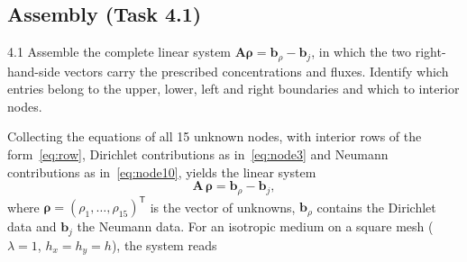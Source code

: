\documentclass[11pt,a4paper]{article}
\numberwithin{equation}{section}
\theoremstyle{definition}
\theoremstyle{remark}
\newcommand{\bA}{\mathbf{A}}
\newcommand{\brho}{\bm{\rho}}
\newcommand{\bb}{\bm{b}}
\begin{document}
\subsection{Assembly (Task 4.1)}\label{sec:assembly}

\begin{task}{4.1}
  Assemble the complete linear system $\bA\brho = \bb_\rho - \bb_j$, in which the two
  right-hand-side vectors carry the prescribed concentrations and fluxes. Identify which
  entries belong to the upper, lower, left and right boundaries and which to interior
  nodes.
\end{task}

Collecting the equations of all 15 unknown nodes, with interior rows of the
form~\eqref{eq:row}, Dirichlet contributions as in~\eqref{eq:node3} and Neumann
contributions as in~\eqref{eq:node10}, yields the linear system
\begin{equation}\label{eq:system}
  \bA\,\brho = \bb_\rho - \bb_j,
\end{equation}
where $\brho = (\rho_1, \dots, \rho_{15})^{\mathsf{T}}$ is the vector of unknowns,
$\bb_\rho$ contains the Dirichlet data and $\bb_j$ the Neumann data. For an isotropic
medium on a square mesh ($\lambda = 1$, $h_x = h_y = h$), the system reads
\begingroup
\setlength{\arraycolsep}{2.4pt}
\footnotesize
\end{document}
